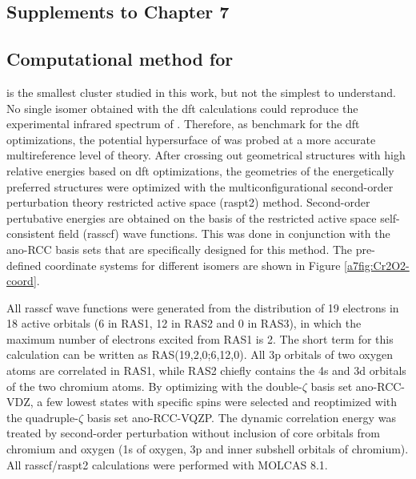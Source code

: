 \begin{refsection}


\chapter{Supplements to Chapter 7}\label{appendix:a7}




\section{Computational method for }


 is the smallest cluster studied in this work, but not the simplest to understand.  No single isomer obtained with the \acrshort{dft} calculations could reproduce the experimental infrared spectrum of . Therefore, as benchmark for the \acrshort{dft} optimizations, the potential hypersurface of  was probed at a more accurate multireference level of theory. After crossing out geometrical structures with high relative energies based on \acrshort{dft} optimizations, the geometries of the energetically preferred structures were optimized with the multiconfigurational second-order perturbation theory restricted active space (\acrshort{raspt2}) method.\cite{raspt2} Second-order pertubative energies are obtained on the basis of the restricted active space self-consistent field (\acrshort{rasscf}) wave functions. This was done in conjunction with the \acrshort{ano}-RCC basis sets that are specifically designed for this method. The pre-defined coordinate systems for different  isomers are shown in Figure \ref{a7fig:Cr2O2-coord}. 

All \acrshort{rasscf} wave functions were generated from the distribution of 19 electrons in 18 active orbitals (6 in RAS1, 12 in RAS2 and 0 in RAS3), in which the maximum number of electrons excited from RAS1 is 2. The short term for this calculation can be written as RAS(19,2,0;6,12,0). All 3p orbitals of two oxygen atoms are correlated in RAS1, while RAS2 chiefly contains the 4s and 3d orbitals of the two chromium atoms. By optimizing with the double-$\zeta$ basis set \acrshort{ano}-RCC-VDZ,\cite{ano-basisnm, ano-basisM} a few lowest states with specific spins were selected and reoptimized with the quadruple-$\zeta$ basis set \acrshort{ano}-RCC-VQZP.\cite{ano-basisnm, ano-basisM} The dynamic correlation energy was treated by second-order perturbation without inclusion of core orbitals from chromium and oxygen (1s of oxygen, 3p and inner subshell orbitals of chromium). All \acrshort{rasscf}/\acrshort{raspt2} calculations were performed with MOLCAS 8.1.\cite{molcas81}


\end{refsection}

